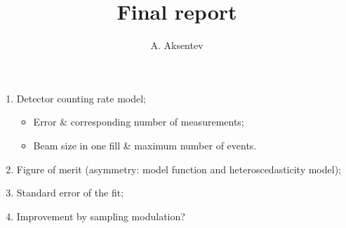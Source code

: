 \documentclass{article}
\title{Final report}
\author{A. Aksentev}
\date{}
\begin{document}
\maketitle

\begin{enumerate}[1.]
	\item Detector counting rate model;
		\begin{itemize}
			\item Error \& corresponding number of measurements;
			\item Beam size in one fill \& maximum number of events.
		\end{itemize}
	\item Figure of merit (asymmetry: model function and heteroscedasticity model);
	\item Standard error of the fit;
	\item Improvement by sampling modulation?
\end{enumerate}
\end{document}
